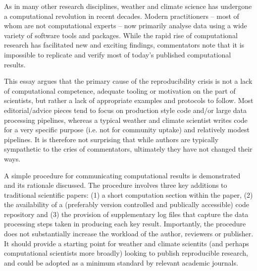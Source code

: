 As in many other research disciplines, weather and climate science has undergone a computational revolution in recent decades. Modern practitioners – most of whom are not computational experts – now primarily analyse data using a wide variety of software tools and packages. While the rapid rise of computational research has facilitated new and exciting findings, commentators note that it is impossible to replicate and verify most of today's published computational results.

This essay argues that the primary cause of the reproducibility crisis is not a lack of computational competence, adequate tooling or motivation on the part of scientists, but rather a lack of appropriate examples and protocols to follow. Most editorial/advice pieces tend to focus on production style code and/or large data processing pipelines, whereas a typical weather and climate scientist writes code for a very specific purpose (i.e. not for community uptake) and relatively modest pipelines. It is therefore not surprising that while authors are typically sympathetic to the cries of commentators, ultimately they have not changed their ways.

A simple procedure for communicating computational results is demonstrated and its rationale discussed. The procedure involves three key additions to traditional scientific papers: (1) a short computation section within the paper, (2) the availability of a (preferably version controlled and publically accessible) code repository and (3) the provision of supplementary log files that capture the data processing steps taken in producing each key result. Importantly, the procedure does not substantially increase the workload of the author, reviewers or publisher. It should provide a starting point for weather and climate scientits (and perhaps computational scientists more broadly) looking to publish reproducible research, and could be adopted as a minimum standard by relevant academic journals.